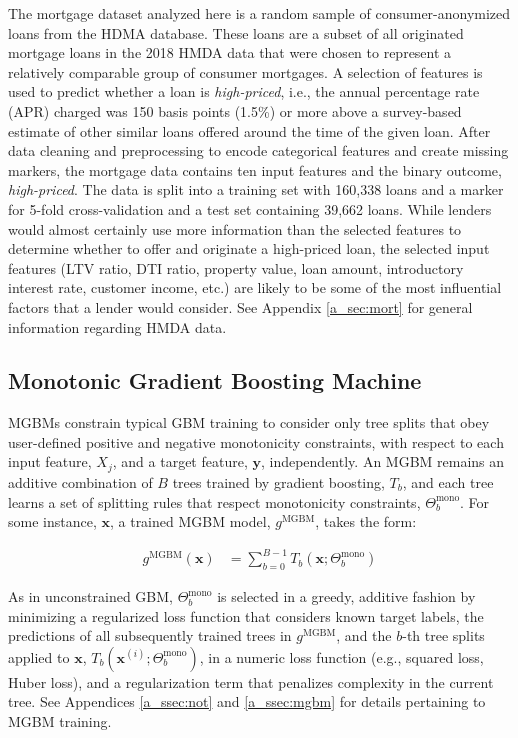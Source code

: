 \documentclass[information,article,submit,moreauthors,pdftex]{definitions/mdpi}
\begin{document}
The mortgage dataset analyzed here is a random sample of consumer-anonymized loans from the HDMA database. These loans are a subset of all originated mortgage loans in the 2018 HMDA data that were chosen to represent a relatively comparable group of consumer mortgages.  A selection of features is used to predict whether a loan is \textit{high-priced}, i.e., the annual percentage rate (APR) charged was 150 basis points (1.5\%) or more above a survey-based estimate of other similar loans offered around the time of the given loan.  After data cleaning and preprocessing to encode categorical features and create missing markers, the mortgage data contains ten input features and the binary outcome, \textit{high-priced}. The data is split into a training set with 160,338 loans and a marker for 5-fold cross-validation and a test set containing 39,662 loans. While lenders would almost certainly use more information than the selected features to determine whether to offer and originate a high-priced loan, the selected input features (LTV ratio, DTI ratio, property value, loan amount, introductory interest rate, customer income, etc.) are likely to be some of the most influential factors that a lender would consider. See Appendix \ref{a_sec:mort} for general information regarding HMDA data.

\subsection{Monotonic Gradient Boosting Machine}\label{ssec:mgbm}

MGBMs constrain typical GBM training to consider only tree splits that obey user-defined positive and negative monotonicity constraints, with respect to each input feature, $X_j$, and a target feature, $\mathbf{y}$, independently. An MGBM remains an additive combination of $B$ trees trained by gradient boosting, $T_b$, and each tree learns a set of splitting rules that respect monotonicity constraints,  $\Theta^\text{mono}_b$. For some instance, $\mathbf{x}$, a trained MGBM model, $g^{\text{MGBM}}$, takes the form:

\begin{equation}
\begin{aligned}\label{eq:gbm}
g^{\text{MGBM}}(\mathbf{x}) &= \sum_{b=0}^{B-1} T_b\left(\mathbf{x}; \Theta^\text{mono}_b\right)
\end{aligned}
\end{equation}

\noindent As in unconstrained GBM, $\Theta^{\text{mono}}_b$ is selected in a greedy, additive fashion by minimizing a regularized loss function that considers known target labels, the predictions of all subsequently trained trees in $g^{\text{MGBM}}$, and the $b$-th tree splits applied to $\mathbf{x}$, $T_b(\mathbf{x}^{(i)};\Theta^\text{mono}_b)$, in a numeric loss function (e.g., squared loss, Huber loss), and a regularization term that penalizes complexity in the current tree. See Appendices \ref{a_ssec:not} and \ref{a_ssec:mgbm} for details pertaining to MGBM training.
\end{document}
